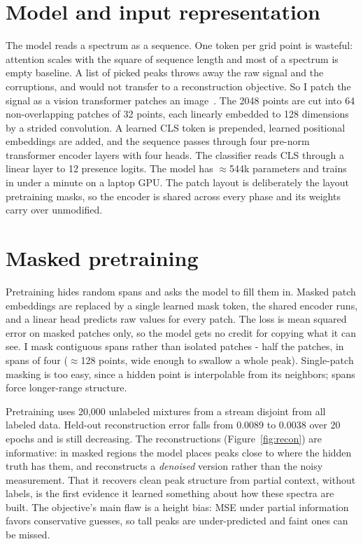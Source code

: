 \documentclass[11pt]{article}
\begin{document}
\section{Model and input representation}

The model reads a spectrum as a sequence. One token per grid point is wasteful: attention
scales with the square of sequence length and most of a spectrum is empty baseline. A list of
picked peaks throws away the raw signal and the corruptions, and would not transfer to a
reconstruction objective. So I patch the signal as a vision transformer patches an
image~\cite{vit}. The 2048 points are cut into 64 non-overlapping patches of 32 points, each
linearly embedded to 128 dimensions by a strided convolution. A learned CLS token is
prepended, learned positional embeddings are added, and the sequence passes through four
pre-norm transformer encoder layers with four heads. The classifier reads CLS through a linear
layer to 12 presence logits. The model has $\approx$544k parameters and trains in under a
minute on a laptop GPU. The patch layout is deliberately the layout pretraining masks, so the
encoder is shared across every phase and its weights carry over unmodified.

\section{Masked pretraining}

Pretraining hides random spans and asks the model to fill them in. Masked patch embeddings are
replaced by a single learned mask token, the shared encoder runs, and a linear head predicts
raw values for every patch. The loss is mean squared error on masked patches only, so the
model gets no credit for copying what it can see. I mask contiguous spans rather than isolated
patches - half the patches, in spans of four ($\approx$128 points, wide enough to swallow a
whole peak). Single-patch masking is too easy, since a hidden point is interpolable from its
neighbors; spans force longer-range structure.

Pretraining uses 20{,}000 unlabeled mixtures from a stream disjoint from all labeled data.
Held-out reconstruction error falls from 0.0089 to 0.0038 over 20 epochs and is still
decreasing. The reconstructions (Figure~\ref{fig:recon}) are informative: in masked regions
the model places peaks close to where the hidden truth has them, and reconstructs a
\emph{denoised} version rather than the noisy measurement. That it recovers clean peak
structure from partial context, without labels, is the first evidence it learned something
about how these spectra are built. The objective's main flaw is a height bias: MSE under
partial information favors conservative guesses, so tall peaks are under-predicted and faint
ones can be missed.
\end{document}
